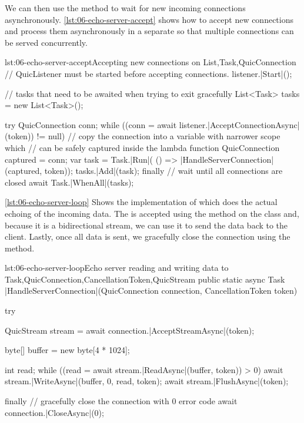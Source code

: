 We can then use the  method to wait for new incoming connections
asynchronously. \autoref{lst:06-echo-server-accept} shows how to accept new connections and process
them asynchronously in a separate  so that multiple connections can be served
concurrently.

\begin{myListingCsharp}{lst:06-echo-server-accept}{Accepting new connections on \QuicListener{}}{List,Task,QuicConnection}{}
    // QuicListener must be started before accepting connections.
    listener.|Start|();

    // tasks that need to be awaited when trying to exit gracefully
    List<Task> tasks = new List<Task>();

    try
    {
        QuicConnection conn;
        while ((conn = await listener.|AcceptConnectionAsync|(token)) != null)
        {
            // copy the connection into a variable with narrower scope which
            // can be safely captured inside the lambda function
            QuicConnection captured = conn;
            var task = Task.|Run|(
                () => |HandleServerConnection|(captured, token));
            tasks.|Add|(task);
        }
    }
    finally
    {
        // wait until all connections are closed
        await Task.|WhenAll|(tasks);
    }
\end{myListingCsharp}

\autoref{lst:06-echo-server-loop} Shows the implementation of  which
does the actual echoing of the incoming data. The \QuicStream{} is accepted using the
 method on the \QuicConnection{} class and, because it is a bidirectional
stream, we can use it to send the data back to the client. Lastly, once all data is sent, we
gracefully close the connection using the  method.

\begin{myListingCsharp}{lst:06-echo-server-loop}{Echo server reading and writing data to \QuicStream{}}{Task,QuicConnection,CancellationToken,QuicStream}{}
public static async Task |HandleServerConnection|(QuicConnection connection,
    CancellationToken token)
{
    try
    {
        QuicStream stream = await connection.|AcceptStreamAsync|(token);

        byte[] buffer = new byte[4 * 1024];

        int read;
        while ((read = await stream.|ReadAsync|(buffer, token)) > 0)
        {
            await stream.|WriteAsync|(buffer, 0, read, token);
            await stream.|FlushAsync|(token);
        }
    }
    finally
    {
        // gracefully close the connection with 0 error code
        await connection.|CloseAsync|(0);
    }
}
\end{myListingCsharp}


